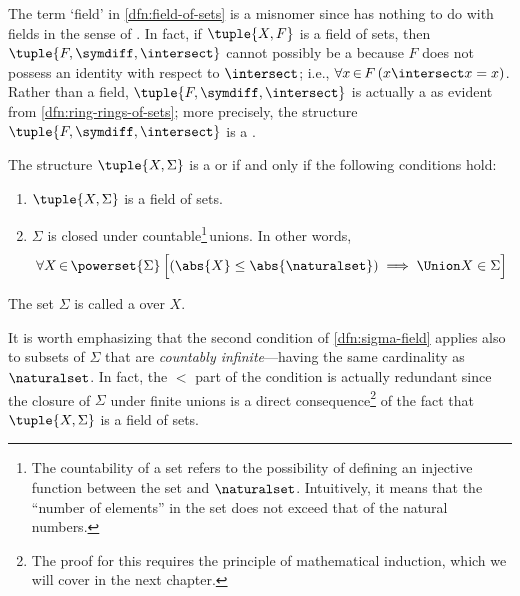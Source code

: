 \begin{rem}
    The term `field' in \cref{dfn:field-of-sets} is a misnomer since has nothing to do with fields in the sense of .
    In fact, if \( \tuple{X, F} \) is a field of sets, then \( \tuple{F, \symdiff, \intersect} \) cannot possibly be a 
    because \( F \) does not possess an identity with respect to \( \intersect \); i.e., \( \forall x\,{\in}\,F \, \mleft( x \intersect x = x \mright) \).
    Rather than a field, \( \tuple{F, \symdiff, \intersect} \) is actually a  as evident from
    \cref{dfn:ring-rings-of-sets}; more precisely, the structure \( \tuple{F, \symdiff, \intersect} \) is a .
\end{rem}

\begin{dfn}
     \label{dfn:sigma-field}
    The structure \( \tuple{X, \Sigma} \) is a  or  if and only if the following conditions hold:
    \begin{enumerate}[topsep=3pt,noitemsep,label=\textup{\texttt{(\alph*)}}]
        \item \( \tuple{X, \Sigma} \) is a field of sets.
        \item \( \Sigma \) is closed under countable\footnote{The countability of a set refers to the possibility of defining an injective
            function between the set and \( \naturalset \). Intuitively, it means that the ``number of elements'' in the set does not exceed
            that of the natural numbers.}\,unions. In other words,
            \begin{equation*}
                \forall X\,{\in}\,\powerset{\Sigma} \, \Big[ \mleft( \abs{X} \leq \abs{\naturalset} \mright) \implies \Union X \in \Sigma \Big]
            \end{equation*}
    \end{enumerate}
    The set \( \Sigma \) is called a  over \( X \).
\end{dfn}

\begin{rem}
    It is worth emphasizing that the second condition of \cref{dfn:sigma-field} applies also to subsets of \( \Sigma \) that are
    \emph{countably infinite}---having the same cardinality as \( \naturalset \).
    In fact, the \( < \) part of the condition is actually redundant since
    the closure of \( \Sigma \) under finite unions is a direct
    consequence\footnote{The proof for this requires the principle of mathematical induction, which we will cover in the next chapter.}
    of the fact that \( \tuple{X, \Sigma} \) is a field of sets.
\end{rem}

